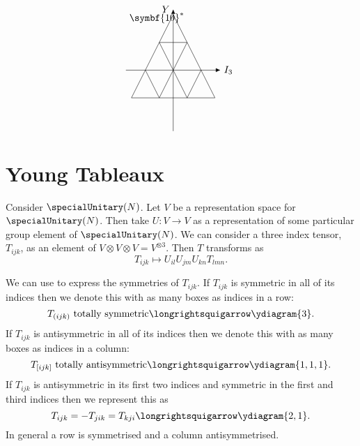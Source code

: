 \documentclass[fleqn]{NotesClass}
\newcommand{\rep}[1]{\symbf{#1}}
\begin{document}
\begin{enumerate}
\begin{equation}
\begin{tikzpicture}[
                >={Latex[width=1.5mm]},
                baseline = (current bounding box)
                ]
                \begin{scope}[xshift=4.5cm]
                    \node[below right] at (-1.7, 2.2) {\(\rep{10}^*\)};
                    \draw (-3/2, -1) -- (3/2, -1) -- (0, 2) -- cycle;
                    \draw (-1, 0) -- (-1/2, -1) -- (0, 0) -- (1/2, -1) -- (1, 0);
                    \draw (-1/2, 1) -- (0, 0) -- (1/2, 1) -- cycle;
                    \draw[->] (-1.7, 0) -- (1.7, 0) node [right] {\(I_3\)};
                    \draw[->] (0, -2.2) -- (0, 2.2) node [left] {\(Y\)};
                \end{scope}
            \end{tikzpicture}
        \end{equation}
    \end{enumerate}
    
    \section{Young Tableaux}
    Consider \(\specialUnitary(N)\).
    Let \(V\) be a representation space for \(\specialUnitary(N)\).
    Then take \(U\colon V \to V\) as a representation of some particular group element of \(\specialUnitary(N)\).
    We can consider a three index tensor, \(T_{ijk}\), as an element of \(V \otimes V \otimes V = V^{\otimes 3}\).
    Then \(T\) transforms as
    \begin{equation}
        T_{ijk} \mapsto U_{il} U_{jm} U_{kn} T_{lmn}.
    \end{equation}
    
    We can use  to express the symmetries of \(T_{ijk}\).
    If \(T_{ijk}\) is symmetric in all of its indices then we denote this with as many boxes as indices in a row:
    \begin{equation}
        T_{(ijk)} \text{ totally symmetric} \longrightsquigarrow \ydiagram{3}.
    \end{equation}
    If \(T_{ijk}\) is antisymmetric in all of its indices then we denote this with as many boxes as indices in a column:
    \begin{equation}
        T_{[ijk]} \text{ totally antisymmetric} \longrightsquigarrow \ydiagram{1,1,1}.
    \end{equation}
    If \(T_{ijk}\) is antisymmetric in its first two indices and symmetric in the first and third indices then we represent this as
    \begin{equation}
        T_{ijk} = -T_{jik} = T_{kji} \longrightsquigarrow \ydiagram{2,1}.
    \end{equation}
    In general a row is symmetrised and a column antisymmetrised.
    
\end{document}
